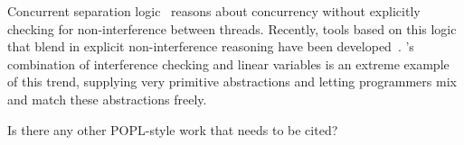 Concurrent separation logic~\cite{OHearn07} reasons about concurrency without 
explicitly checking for non-interference between threads. 
Recently, tools based on this logic that blend in explicit non-interference reasoning have been developed~\cite{SAGL,RGSep}. 
\civl's combination of interference checking and linear variables is an extreme example of this trend,
supplying very primitive abstractions and letting programmers mix and match these abstractions freely.

Is there any other POPL-style work that needs to be cited?
